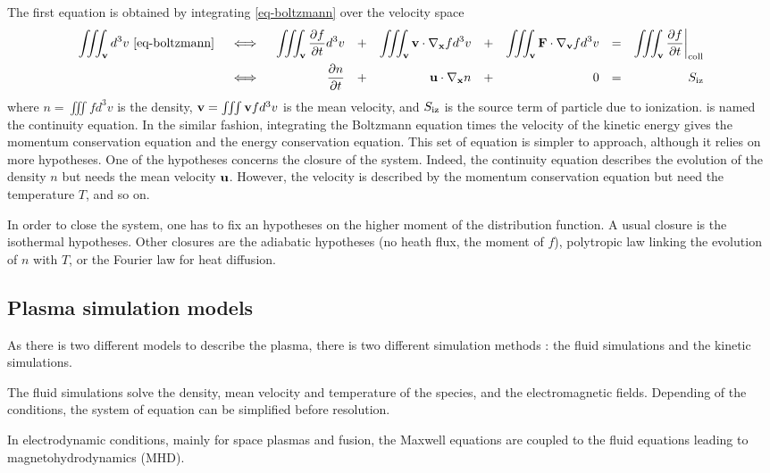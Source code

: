 The first equation is obtained by integrating \cref{eq-boltzmann} over the velocity space
\begin{align}
  \iiint_{\vect{v}} d^3v \text{ \cref{eq-boltzmann}} &&{ } \iff { }&& \iiint_{\vect{v}}  \deriv{f}{t} d^3v &&+&& \iiint_{\vect{v}}  \vect{v} \cdot \grad_{\vect{x}} f  d^3v &&+&&  \iiint_{\vect{v}}  \vect{F} \cdot  \grad_{\vect{v}} f  d^3v && = && \iiint_{\vect{v}}  \deriv{f}{t} \at{\rm coll} \nonumber  \\ 
  && { } \iff { }&&  \deriv{n}{t} &&+&& \vect{u}  \cdot \grad_{\vect{x}} n &&+&& 0 &&=&& S_{\rm iz}   \label{eq-conc}
\end{align} 
where $n=\iiint f d^3v$ is the density, ${\mathbf v} = \iiint {\mathbf v} f d^3v$ is the mean velocity, and $S_{\rm iz}$ is the source term of particle due to ionization.
 is named the continuity equation.
In the similar fashion, integrating the Boltzmann equation times the velocity of the kinetic energy gives the momentum conservation equation and the energy conservation equation.
This set of equation is simpler to approach, although it relies on more hypotheses.
One of the hypotheses concerns the closure of the system.
Indeed, the continuity equation describes the evolution of the density $n$ but needs the mean velocity ${\mathbf u}$.
However, the velocity is described by the momentum conservation equation but need the temperature $T$, and so on.

In order to close the system, one has to fix an hypotheses on the higher moment of the distribution function.
A usual closure is the isothermal hypotheses. 
Other closures are the adiabatic hypotheses (no heath flux, the  moment of $f$), polytropic law linking the evolution of $n$ with $T$, or the Fourier law for heat diffusion.

\subsection*{Plasma simulation models} \label{subsec-simulations}
As there is two different models to describe the plasma, there is two different simulation methods : the fluid simulations and the kinetic simulations.

The fluid simulations solve the density, mean velocity and temperature of the species, and the electromagnetic fields.
Depending of the conditions, the system of equation can be simplified before resolution.

In electrodynamic conditions, mainly for space plasmas and fusion, the Maxwell equations are coupled to the fluid equations leading to magnetohydrodynamics (MHD).

